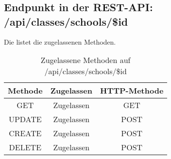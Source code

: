 \subsection{Endpunkt in der REST-API: /api/classes/schools/\$id}
Die  listet die zugelassenen Methoden. 

\begin{table}[!htbp]
	\begin{tabular}{|c|c|c|}
		\hline
			\textbf{Methode} & \textbf{Zugelassen} & \textbf{HTTP-Methode} \\ \hline
			GET & Zugelassen & GET \\ \hline
			UPDATE & Zugelassen & POST \\ \hline 
			CREATE & Zugelassen & POST \\ \hline 
			DELETE & Zugelassen & POST \\ \hline
	\end{tabular}

		\caption{Zugelassene Methoden auf /api/classes/schools/\$id}
		\label{tab:end:rest:api:classes:schools:id:meth}
\end{table}